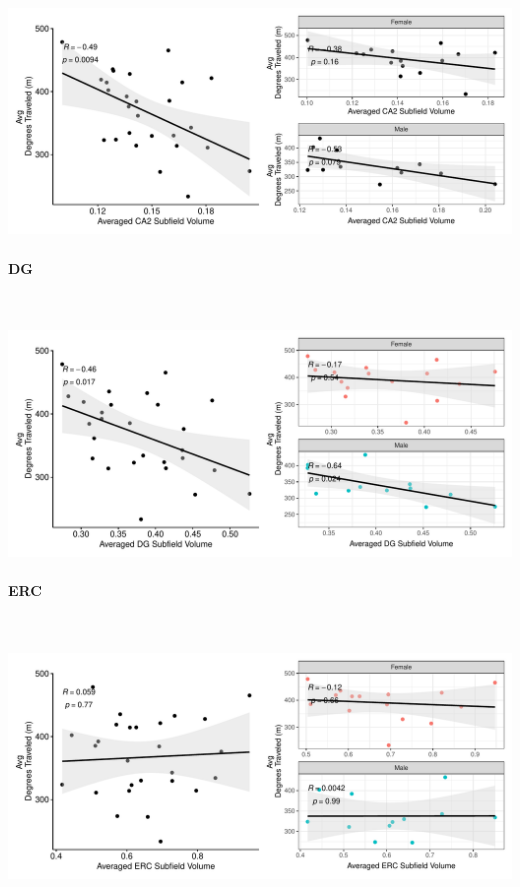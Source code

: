 \documentclass[
]{article}
\begin{document}
\includegraphics{hippocampal_subfield_files/figure-latex/unnamed-chunk-16-1.pdf}

\paragraph{DG}

~ \vspace{1cm}

\includegraphics{hippocampal_subfield_files/figure-latex/unnamed-chunk-17-1.pdf}

\paragraph{ERC}

~ \vspace{1cm}

\includegraphics{hippocampal_subfield_files/figure-latex/unnamed-chunk-18-1.pdf}
\end{document}
